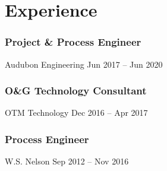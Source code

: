 %
%
\section{Experience}
  \subsubsection{Project \& Process Engineer}
  \position%
    {Audubon Engineering}%
    {Jun 2017 -- Jun 2020}%
    \Location
  \subsubsection{O\&G Technology Consultant}
  \position%
    {OTM Technology}%
    {Dec 2016 -- Apr 2017}%
    \Location
  \subsubsection{Process Engineer}
  \position%
    {W.S. Nelson}%
    {Sep 2012 -- Nov 2016}%
    \Location
%
%
%